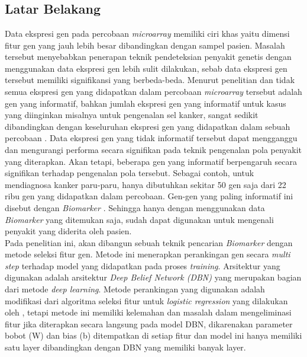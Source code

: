 \chapter{\babSatu}

\section{Latar Belakang}
Data ekspresi gen pada percobaan \textit{microarray} memiliki ciri khas yaitu dimensi fitur gen yang jauh lebih besar dibandingkan dengan sampel pasien. Masalah tersebut menyebabkan penerapan teknik pendeteksian penyakit genetis dengan menggunakan data ekspresi gen  lebih sulit dilakukan, sebab data ekspresi gen tersebut memiliki signifikansi yang berbeda-beda. Menurut penelitian \cite{yoon2006building} dan \cite{bandyopadhyay2014survey} tidak semua ekspresi gen yang didapatkan dalam percobaan \textit{microarray} tersebut adalah gen yang informatif, bahkan jumlah ekspresi gen yang informatif untuk kasus yang diinginkan misalnya untuk pengenalan sel kanker, sangat sedikit dibandingkan dengan keseluruhan ekspresi gen yang didapatkan dalam sebuah percobaan \citep{bandyopadhyay2014survey}. Data ekspresi gen yang tidak informatif tersebut dapat mengganggu dan mengurangi performa secara signifikan pada teknik pengenalan pola penyakit yang diterapkan. Akan tetapi, beberapa gen yang informatif berpengaruh secara signifikan terhadap pengenalan pola tersebut. Sebagai contoh, untuk mendiagnosa kanker paru-paru, hanya dibutuhkan sekitar 50 gen saja dari 22 ribu gen yang didapatkan dalam percobaan. Gen-gen yang paling informatif ini disebut dengan \textit{Biomarker} \citep{belinsky2004gene}. Sehingga hanya dengan menggunakan data \textit{Biomarker} yang ditemukan saja, sudah dapat digunakan untuk mengenali penyakit yang diderita oleh pasien.\\

Pada penelitian ini, akan dibangun sebuah teknik pencarian \textit{Biomarker} dengan metode seleksi fitur gen. Metode ini menerapkan perankingan gen secara \textit{multi step} terhadap model yang didapatkan pada proses \textit{training}. Arsitektur yang digunakan adalah arsitektur \textit{Deep Belief Network (DBN)} yang merupakan bagian dari metode \textit{deep learning}. Metode perankingan yang digunakan adalah modifikasi dari algoritma seleksi fitur untuk \textit{logistic regression} yang dilakukan oleh \cite{shevade2003simple}, tetapi metode ini memiliki kelemahan dan masalah dalam  mengeliminasi fitur jika diterapkan secara langsung pada model DBN, dikarenakan parameter bobot (W) dan bias (b) ditempatkan di setiap fitur dan model ini hanya memiliki satu layer dibandingkan dengan DBN yang memiliki banyak layer. \\

